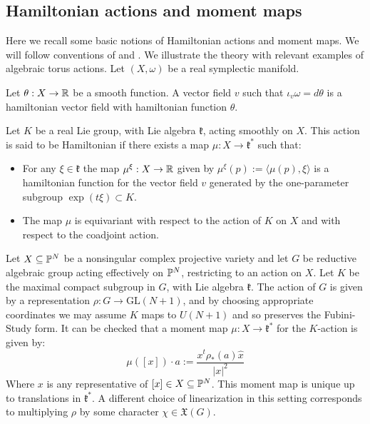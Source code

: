 \subsection{Hamiltonian actions and moment maps} \label{basics:momentmaps}
Here we recall some basic notions of Hamiltonian actions and moment maps. We will follow conventions of \cite{da2006symplectic} and \cite{berman2014complex}. We illustrate the theory with relevant examples of algebraic torus actions. Let \((X,\omega)\) be a real symplectic manifold.
\begin{definition}
Let \(\theta: X \to \mathbb{R}\) be a smooth function. A vector field \(v\) such that  \(\iota_v \omega = d \theta\) is a hamiltonian vector field with hamiltonian function \(\theta\). 
\end{definition}
\begin{definition}
Let \(K\) be a real Lie group, with Lie algebra \(\mathfrak{k}\), acting smoothly on \(X\). This action is said to be Hamiltonian if there exists a map \(\mu: X \to \mathfrak{k}^*\) such that:
\begin{itemize}
\item For any \(\xi \in \mathfrak{k}\) the map \(\mu^\xi : X \to \mathbb{R}\) given by \(\mu^\xi(p) := \langle \mu(p), \xi \rangle \) is a hamiltonian function for the vector field \(v\) generated by the one-parameter subgroup \(\exp(t \xi) \subset K\).
\item The map \(\mu\) is equivariant with respect to the action of \(K\) on \(X\) and with respect to the coadjoint action.
\end{itemize}
\end{definition}
Let \(X \subseteq \mathbb{P}^N\) be a nonsingular complex projective variety and let \(G\) be reductive algebraic group acting effectively on \(\mathbb{P}^N\), restricting to an action on \(X\). Let \(K\) be the maximal compact subgroup in \(G\), with Lie algebra \(\mathfrak{k}\). The action of \(G\) is given by a representation \(\rho: G \to \text{GL}(N+1)\), and by choosing appropriate coordinates we may assume \(K\) maps to \(U(N+1)\) and so preserves the Fubini-Study form. It can be checked that a moment map \(\mu: X \to \mathfrak{k}^*\) for the \(K\)-action is given by:
\begin{equation}\label{eq:mu}
\mu([x]) \cdot a := \frac{x^t \rho_*(a) \hat{x}}{ |x|^2}
\end{equation}
Where \(x\) is any representative of \([x] \in X \subseteq \mathbb{P}^N\). This moment map is unique up to translations in \(\mathfrak{k}^*\). A different choice of linearization in this setting corresponds to multiplying \(\rho\) by some character \(\chi \in \mathfrak{X}(G)\).

